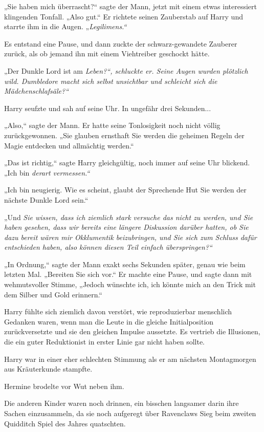 {„Sie haben mich überrascht?“ sagte der Mann, jetzt mit einem etwas interessiert klingenden Tonfall. „Also gut.“ Er richtete seinen Zauberstab auf Harry und starrte ihm in die Augen. „\emph{Legilimens.“}

Es entstand eine Pause, und dann zuckte der schwarz-gewandete Zauberer zurück, als ob jemand ihn mit einem Viehtreiber geschockt hätte.

„Der Dunkle Lord ist am \emph{Leben?“, schluckte er. Seine Augen wurden plötzlich wild. \emph{Dumbledore macht sich selbst unsichtbar und schleicht sich die Mädchenschlafsäle?“}}

Harry seufzte und sah auf seine Uhr. In ungefähr drei Sekunden...

„Also,“ sagte der Mann. Er hatte seine Tonlosigkeit noch nicht völlig zurückgewonnen. „Sie glauben ernsthaft Sie werden die geheimen Regeln der Magie entdecken und allmächtig werden.“

„Das ist richtig,“ sagte Harry gleichgültig, noch immer auf seine Uhr blickend. „Ich bin \emph{derart vermessen.“}

„Ich bin neugierig. Wie es scheint, glaubt der Sprechende Hut Sie werden der nächste Dunkle Lord sein.“

„Und \emph{Sie wissen, dass ich ziemlich stark versuche das nicht zu werden, und Sie haben gesehen, dass wir bereits eine längere Diskussion darüber hatten, ob Sie dazu bereit wären mir Okklumentik beizubringen, und Sie sich zum Schluss dafür entschieden haben, also können diesen Teil einfach überspringen?“}

„In Ordnung,“ sagte der Mann exakt sechs Sekunden später, genau wie beim letzten Mal. „Bereiten Sie sich vor.“ Er machte eine Pause, und sagte dann mit wehmutsvoller Stimme, „Jedoch wünschte ich, ich könnte mich an den Trick mit dem Silber und Gold erinnern.“

Harry fühlte sich ziemlich davon verstört, wie reproduzierbar menschlich Gedanken waren, wenn man die Leute in die gleiche Initialposition zurückversetzte und sie den gleichen Impulse aussetzte. Es vertrieb die Illusionen, die ein guter Reduktionist in erster Linie gar nicht haben sollte.

Harry war in einer eher schlechten Stimmung als er am nächsten Montagmorgen aus Kräuterkunde stampfte.

Hermine brodelte vor Wut neben ihm.

Die anderen Kinder waren noch drinnen, ein bisschen langsamer darin ihre Sachen einzusammeln, da sie noch aufgeregt über Ravenclaws Sieg beim zweiten Quidditch Spiel des Jahres quatschten.

}
